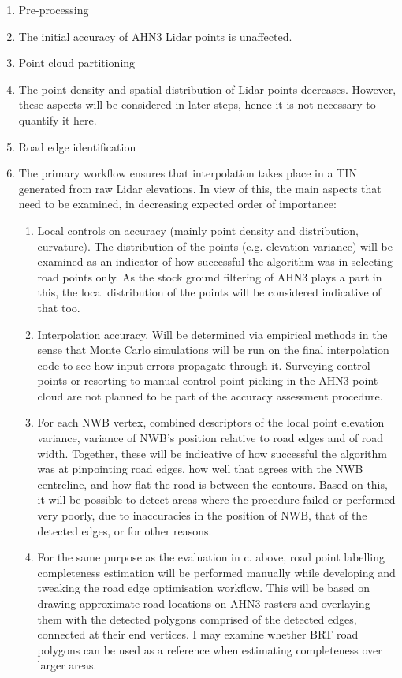 \begin{enumerate}
    \item Pre-processing
    \item[] The initial accuracy of AHN3 Lidar points is unaffected.
    \item Point cloud partitioning
    \item[] The point density and spatial distribution of Lidar points decreases. However, these aspects will be considered in later steps, hence it is not necessary to quantify it here.
    \item Road edge identification
    \item[] The primary workflow ensures that interpolation takes place in a TIN generated from raw Lidar elevations. In view of this, the main aspects that need to be examined, in decreasing expected order of importance:
    \begin{enumerate}
        \item Local controls on accuracy (mainly point density and distribution, curvature). The distribution of the points (e.g. elevation variance) will be examined as an indicator of how successful the algorithm was in selecting road points only. As the stock ground filtering of AHN3 plays a part in this, the local distribution of the points will be considered indicative of that too.
        \item Interpolation accuracy. Will be determined via empirical methods in the sense that Monte Carlo simulations will be run on the final interpolation code to see how input errors propagate through it. Surveying control points or resorting to manual control point picking in the AHN3 point cloud are not planned to be part of the accuracy assessment procedure.
        \item For each NWB vertex, combined descriptors of the local point elevation variance, variance of NWB’s position relative to road edges and of road width. Together, these will be indicative of how successful the algorithm was at pinpointing road edges, how well that agrees with the NWB centreline, and how flat the road is between the contours. Based on this, it will be possible to detect areas where the procedure failed or performed very poorly, due to inaccuracies in the position of NWB, that of the detected edges, or for other reasons.
        \item For the same purpose as the evaluation in c. above, road point labelling completeness estimation will be performed manually while developing and tweaking the road edge optimisation workflow. This will be based on drawing approximate road locations on AHN3 rasters and overlaying them with the detected polygons comprised of the detected edges, connected at their end vertices. I may examine whether BRT road polygons can be used as a reference when estimating completeness over larger areas.

\end{enumerate}
\end{enumerate}
